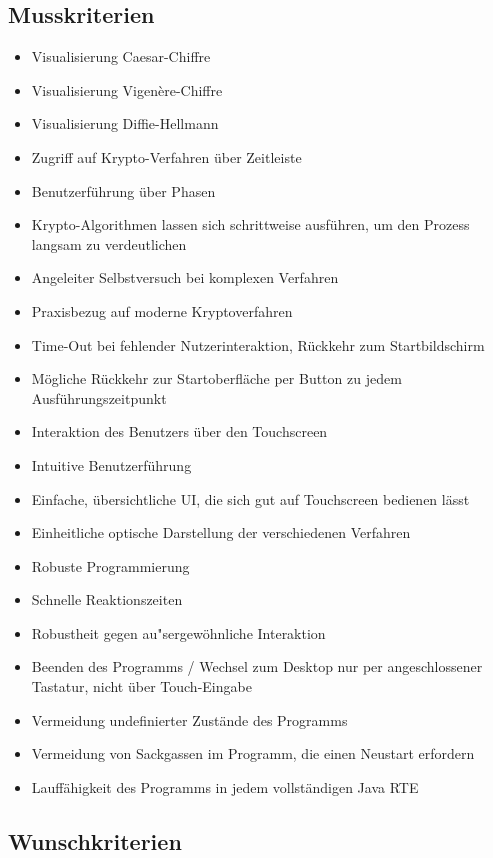 \documentclass{article}
\begin{document}
\subsection{Musskriterien}

\begin{itemize}
    \item Visualisierung Caesar-Chiffre
    \item Visualisierung Vigenère-Chiffre
    \item Visualisierung Diffie-Hellmann
    \item Zugriff auf Krypto-Verfahren über Zeitleiste
    \item Benutzerführung über Phasen
    \item Krypto-Algorithmen lassen sich schrittweise ausführen, um den Prozess
        langsam zu verdeutlichen
    \item Angeleiter Selbstversuch bei komplexen Verfahren
    \item Praxisbezug auf moderne Kryptoverfahren
    \item Time-Out bei fehlender Nutzerinteraktion, Rückkehr zum Startbildschirm
    \item Mögliche Rückkehr zur Startoberfläche per Button zu jedem Ausführungszeitpunkt
    \item Interaktion des Benutzers über den Touchscreen
    \item Intuitive Benutzerführung
    \item Einfache, übersichtliche UI, die sich gut auf Touchscreen bedienen lässt
    \item Einheitliche optische Darstellung der verschiedenen Verfahren
    \item Robuste Programmierung
    \item Schnelle Reaktionszeiten
    \item Robustheit gegen au"sergewöhnliche Interaktion
    \item Beenden des Programms / Wechsel zum Desktop nur per angeschlossener Tastatur, nicht über Touch-Eingabe
    \item Vermeidung undefinierter Zustände des Programms
    \item Vermeidung von Sackgassen im Programm, die einen Neustart erfordern
    \item Lauffähigkeit des Programms in jedem vollständigen Java RTE
\end{itemize}

\subsection{Wunschkriterien}
\end{document}
